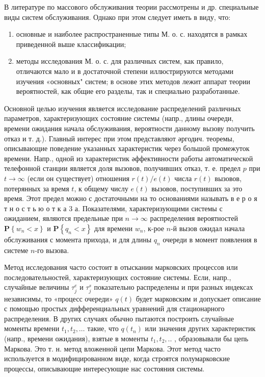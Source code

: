 \documentclass[10pt]{article}
\begin{document}
В литературе по массового обслуживания теории рассмотрены и др. специальные виды систем обслуживания. Однако при этом следует иметь в виду, что:



\begin{enumerate}

  \item основные и наиболее распространенные типы М. о. с. находятся в рамках приведенной выше классификации;



  \item методы исследования М. о. с. для различных систем, как правило, отличаются мало и в достаточной степени иллюстрируются методами изучения «основных" систем; в основе этих методов лежит аппарат теории вероятностей, как общие его разделы, так и специально разработанные.



\end{enumerate}



Основной целью изучения является исследование распределений различных параметров, характеризующих состояние системы (напр., длины очереди, времени ожидания начала обслуживания, вероятности данному вызову получить отказ и т. д.). Главный интерес при этом представляют әргодич. теоремы, описывающие поведение указанных характеристик через большой промежуток времени. Напр., одной из характеристик әффективности работы автоматической телефонной станции является доля вызовов, получивших отказ, т. е. предел $p$ при $t \rightarrow \infty$ (если он существует) отношения $r(t) / e(t)$ числа $r(t)$ вызовов, потерянных за время $t$, к общему числу $e(t)$ вызовов, поступивших за это время. Этот предел можно с достаточными на то основаниями называть в е р о я т н о с т ь ю о т к а 3 а. Показателями, характеризующими системы с ожиданием, являются предельные при $n \rightarrow \infty$ распределения вероятностей $\mathbf{P}\left\{w_{n}<x\right\}$ и $\mathbf{P}\left\{q_{n}<x\right\}$ для времени $w_{n}$, к-рое $n$-й вызов ожидал начала обслуживания с момента прихода, и для длины $q_{n}$ очереди в момент появления в системе $n$-го вызова.



Метод исследования часто состоит в отыскании марковских процессов или последовательностей, характеризующих состояние системы. Если, напр., случайные величины $\tau_{j}^{e}$ и $\tau_{j}^{s}$ показательно распределены и при разных индексах независимы, то «процесс очереди» $q(t)$ будет марковским и допускает описание с помощью простых дифференциальных уравнений для стационарного распределения. В других случаях обычно пытаются построить случайные моменты времени $t_{1}, t_{2}, \ldots$ такие, что $q\left(t_{n}\right)$ или значения других характеристик (напр., времени ожидания), взятые в моменты $t_{1}, t_{2}, .$. , образовывали бы цепь Маркова. Это т. н. метод вложенной цепи Маркова. Этот метод часто используется в модифицированном виде, когда строятся полумарковские процессы, описывающие интересующие нас состояния системы.
\end{document}
